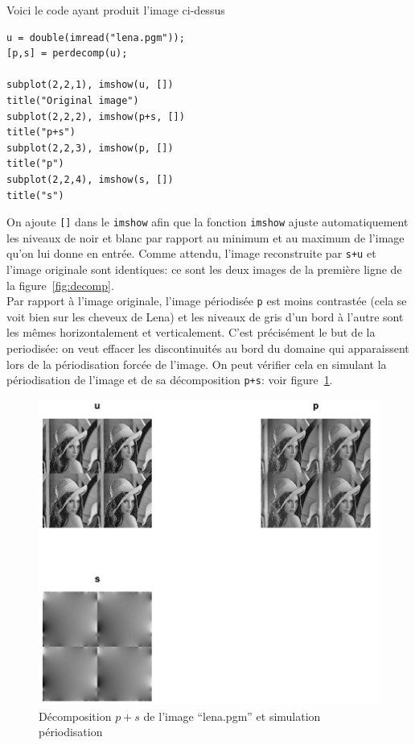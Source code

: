 \documentclass[a4paper, 11pt]{article}
\begin{document}
Voici le code ayant produit l'image ci-dessus

\begin{lstlisting}[frame=single]
u = double(imread("lena.pgm"));
[p,s] = perdecomp(u);

subplot(2,2,1), imshow(u, [])
title("Original image")
subplot(2,2,2), imshow(p+s, [])
title("p+s")
subplot(2,2,3), imshow(p, [])
title("p")
subplot(2,2,4), imshow(s, [])
title("s")
\end{lstlisting}

On ajoute \texttt{[]} dans le \texttt{imshow} afin que la fonction \texttt{imshow} ajuste automatiquement les niveaux de noir et blanc
par rapport au minimum et au maximum de l'image qu'on lui donne en entrée. Comme attendu, l'image reconstruite par
\texttt{s+u} et l'image originale sont identiques: ce sont les deux images de la première ligne de la
figure~\ref{fig:decomp}.\\

Par rapport à l'image originale, l'image périodisée \texttt{p} est moins contrastée (cela se voit bien sur les cheveux de
Lena) et les niveaux de gris d'un bord à l'autre sont les mêmes horizontalement et verticalement. C'est précisément le
but de la periodisée: on veut effacer les discontinuités au bord du domaine qui apparaissent lors de la périodisation
forcée de l'image. On peut vérifier cela en simulant la périodisation de l'image et de sa décomposition \texttt{p+s}:
voir figure~\ref{fig:tile}.

\begin{figure}[!h]
\centering
\includegraphics[width=14cm]{lena_perdecomp_tile.png}
\caption{Décomposition $p+s$ de l'image “lena.pgm” et simulation périodisation}
\label{fig:tile}
\end{figure}
\end{document}
